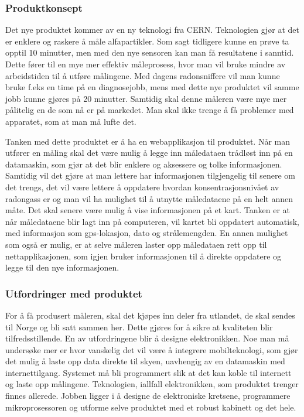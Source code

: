 \subsubsection{Produktkonsept}

Det nye produktet kommer av en ny teknologi fra CERN. Teknologien gjør at det er enklere og raskere å måle alfapartikler. Som sagt tidligere kunne en prøve ta opptil 10 minutter, men med den nye sensoren kan man få resultatene i sanntid. Dette fører til en mye mer effektiv måleprosess, hvor man vil bruke mindre av arbeidstiden til å utføre målingene. Med dagens radonsniffere vil man kunne bruke f.eks en time på en diagnosejobb, mens med dette nye produktet vil samme jobb kunne gjøres på 20 minutter. Samtidig skal denne måleren være mye mer pålitelig en de som nå er på markedet. Man skal ikke trenge å få problemer med apparatet, som at man må lufte det.	

Tanken med dette produktet er å ha en webapplikasjon til produktet. Når man utfører en måling skal det være mulig å legge inn måledataen trådløst inn på en datamaskin, som gjør at det blir enklere og aksessere og tolke informasjonen. Samtidig vil det gjøre at man lettere har informasjonen tilgjengelig til senere om det trengs, det vil være lettere å oppdatere hvordan konsentrasjonsnivået av radongass er og man vil ha mulighet til å utnytte måledataene på en helt annen måte. Det skal senere være mulig å vise informasjonen på et kart. Tanken er at når måledataene blir lagt inn på computeren, vil kartet bli oppdatert automatisk, med informasjon som gps-lokasjon, dato og strålemengden. En annen mulighet som også er mulig, er at selve måleren laster opp måledataen rett opp til nettapplikasjonen, som igjen bruker informasjonen til å direkte oppdatere og legge til den nye informasjonen.

\subsubsection{Utfordringer med produktet}

For å få produsert måleren, skal det kjøpes inn deler fra utlandet, de skal sendes til Norge og bli satt sammen her. Dette gjøres for å sikre at kvaliteten blir tilfredsstillende. En av utfordringene blir å designe elektronikken. Noe man må undersøke mer er hvor vanskelig det vil være å integrere mobilteknologi, som gjør det mulig å laste opp data direkte til skyen, uavhengig av en datamaskin med internettilgang. Systemet må bli programmert slik at det kan koble til internett og laste opp målingene. Teknologien, iallfall elektronikken, som produktet trenger finnes allerede. Jobben ligger i å designe de elektroniske kretsene, programmere mikroprosessoren og utforme selve produktet med et robust kabinett og det hele.


